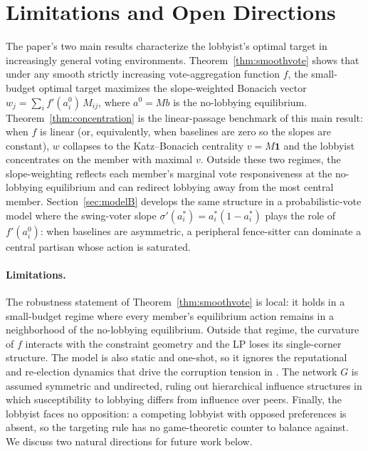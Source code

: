 \documentclass[11pt,letterpaper]{article}
\theoremstyle{plain}
\theoremstyle{definition}
\theoremstyle{remark}
\begin{document}

\section{Limitations and Open Directions}
\label{sec:discussion}

The paper's two main results characterize the lobbyist's optimal target in increasingly general voting environments. Theorem~\ref{thm:smoothvote} shows that under any smooth strictly increasing vote-aggregation function $f$, the small-budget optimal target maximizes the slope-weighted Bonacich vector $w_j = \sum_i f'(a_i^0)\, M_{ij}$, where $a^0 = Mb$ is the no-lobbying equilibrium. Theorem~\ref{thm:concentration} is the linear-passage benchmark of this main result: when $f$ is linear (or, equivalently, when baselines are zero so the slopes are constant), $w$ collapses to the Katz--Bonacich centrality $v = M\mathbf{1}$ and the lobbyist concentrates on the member with maximal $v$. Outside these two regimes, the slope-weighting reflects each member's marginal vote responsiveness at the no-lobbying equilibrium and can redirect lobbying away from the most central member. Section~\ref{sec:modelB} develops the same structure in a probabilistic-vote model where the swing-voter slope $\sigma'(a_i^*) = a_i^*(1 - a_i^*)$ plays the role of $f'(a_i^0)$: when baselines are asymmetric, a peripheral fence-sitter can dominate a central partisan whose action is saturated.

\paragraph{Limitations.} The robustness statement of Theorem~\ref{thm:smoothvote} is local: it holds in a small-budget regime where every member's equilibrium action remains in a neighborhood of the no-lobbying equilibrium. Outside that regime, the curvature of $f$ interacts with the constraint geometry and the LP loses its single-corner structure. The model is also static and one-shot, so it ignores the reputational and re-election dynamics that drive the corruption tension in \citet{shleifer1993}. The network $G$ is assumed symmetric and undirected, ruling out hierarchical influence structures in which susceptibility to lobbying differs from influence over peers. Finally, the lobbyist faces no opposition: a competing lobbyist with opposed preferences is absent, so the targeting rule has no game-theoretic counter to balance against. We discuss two natural directions for future work below.
\end{document}
